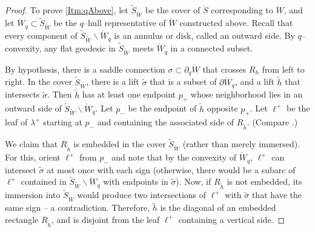 \documentclass[11pt,letterpaper]{amsart}
\newcommand{\wt}{\widetilde}
\newcommand{\mr}{\mathring}
\newcommand{\bdy}{\partial} %
\newcommand{\psub}{\mr W}
\numberwithin{equation}{section}
\theoremstyle{definition}
\renewcommand{\setminus}{\smallsetminus}
\begin{document}
\begin{proof}%

To prove \eqref{Itm:qAbove}, let $\wt S_{\psub}$ be the cover of $\mr S$ corresponding to $\psub$, and let $\psub_q \subset \wt S_{\psub}$ be the $q$--hull representative of $\psub$ constructed above. Recall that every component of $\wt S_{\psub} \setminus \psub_q$ is an annulus or disk, called an outward side.
%
By $q$--convexity, any flat geodesic in $\wt S_{\psub}$ meets $\psub_q$ in a connected subset. 

By hypothesis, there is a saddle connection $\sigma \subset \bdy_q \psub$ that crosses $R_h$ from left to right. In the cover $\wt S_{\psub}$, there is a lift $\widetilde \sigma$ that is a subset of $\bdy \psub_q$, and a lift $\widetilde h$ that intersects 
$\widetilde \sigma$.
Then $\widetilde h$  has at least one endpoint $p_+$ whose neighborhood lies in an outward side of $\wt S_{\psub} \setminus \psub_q$.
Let $p_-$ be the endpoint of $\widetilde h$ opposite $p_+$.
Let  $\ell^+$ be the leaf of $\lambda^+$ starting at $p_-$ and containing the associated side of $R_{\widetilde h}$. (Compare \cite[Figure 22]{MinskyTaylor:FiberedFaces}.)


We claim that $R_{\wt h}$ is embedded in the cover $\wt S_{\psub}$ (rather than merely immersed).
For this, orient $\ell^+$ from $p_-$ and note that by the convexity of $\psub_q$, $\ell^+$ can intersect $\wt \sigma$ at most once with each sign (otherwise, there would be a subarc of $\ell^+$ contained in $\wt S_{\psub} \setminus \psub_q$ with endpoints in $\wt \sigma$). Now, if $R_{\wt h}$ is not embedded, its immersion into $\wt S_{\psub}$ would produce two intersections of $\ell^+$ with $\wt \sigma$ that have the same sign -- a contradiction. Therefore, $\widetilde h$ is the diagonal of an embedded rectangle $R_{\wt h}$, and is disjoint from the leaf $\ell^+$ containing a vertical side.


\end{proof}
\end{document}
